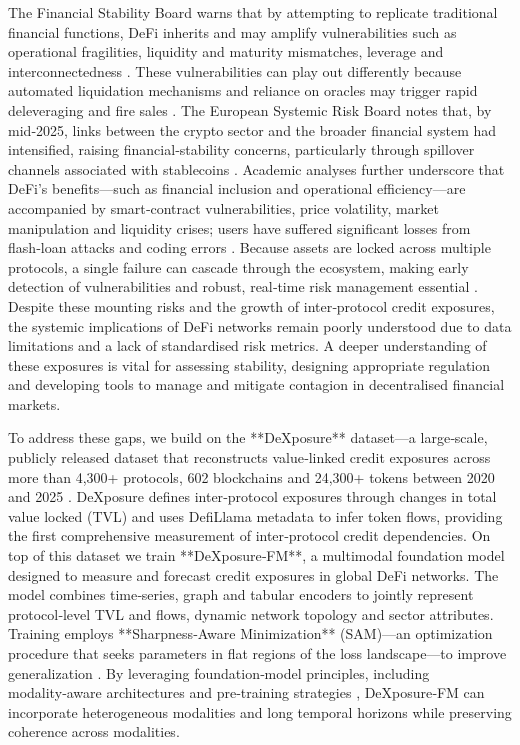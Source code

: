 The Financial Stability Board warns that by attempting to replicate traditional financial functions, DeFi inherits and may amplify vulnerabilities such as operational fragilities, liquidity and maturity mismatches, leverage and interconnectedness \cite{FSB2023}.  These vulnerabilities can play out differently because automated liquidation mechanisms and reliance on oracles may trigger rapid deleveraging and fire sales \cite{FSB2023}.  The European Systemic Risk Board notes that, by mid‑2025, links between the crypto sector and the broader financial system had intensified, raising financial‑stability concerns, particularly through spillover channels associated with stablecoins \cite{ESRB2025}.  Academic analyses further underscore that DeFi’s benefits—such as financial inclusion and operational efficiency—are accompanied by smart‑contract vulnerabilities, price volatility, market manipulation and liquidity crises; users have suffered significant losses from flash‑loan attacks and coding errors \cite{Adamyk2025}.  Because assets are locked across multiple protocols, a single failure can cascade through the ecosystem, making early detection of vulnerabilities and robust, real‑time risk management essential \cite{Adamyk2025}.  Despite these mounting risks and the growth of inter‑protocol credit exposures, the systemic implications of DeFi networks remain poorly understood due to data limitations and a lack of standardised risk metrics.  A deeper understanding of these exposures is vital for assessing stability, designing appropriate regulation and developing tools to manage and mitigate contagion in decentralised financial markets.


To address these gaps, we build on the **DeXposure** dataset—a large‑scale, publicly released dataset that reconstructs value‑linked credit exposures across more than 4,300+ protocols, 602 blockchains and 24,300+ tokens between 2020 and 2025  \cite{wu2025dexposure}.  DeXposure defines inter‑protocol exposures through changes in total value locked (TVL) and uses DefiLlama metadata to infer token flows, providing the first comprehensive measurement of inter‑protocol credit dependencies.  On top of this dataset we train **DeXposure‑FM**, a multimodal foundation model designed to measure and forecast credit exposures in global DeFi networks.  The model combines time‑series, graph and tabular encoders to jointly represent protocol‑level TVL and flows, dynamic network topology and sector attributes.  Training employs **Sharpness‑Aware Minimization** (SAM)—an optimization procedure that seeks parameters in flat regions of the loss landscape—to improve generalization  \cite{oikonomou2025sam}.  By leveraging foundation‑model principles, including modality‑aware architectures and pre‑training strategies  \cite{eremeev2025g2tfm,liang2024fmts}, DeXposure‑FM can incorporate heterogeneous modalities and long temporal horizons while preserving coherence across modalities.

